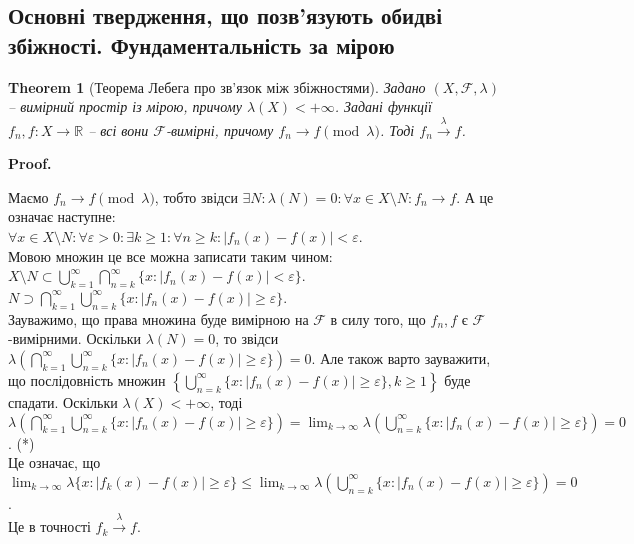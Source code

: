 \documentclass[a4paper, 10pt]{article}
\makeatletter
\theoremstyle{theoremdd}
\newtheorem{theorem}{Theorem}[subsection]
\newcommand\tomeasure[1]{\overset{{#1}}{\to}}
\renewenvironment{proof}[1][Proof.\\]{\par
\pushQED{\hfill \qed}%
\normalfont \topsep6\p@\@plus6\p@\relax
\trivlist
\item\relax
{\bfseries
#1\@addpunct{.}}\hspace\labelsep\ignorespaces
}{%
\popQED\endtrivlist\@endpefalse
}
\makeatother
\begin{document}
\subsection{Основні твердження, що позв'язують обидві збіжності. Фундаментальність за мірою}
\begin{theorem}[Теорема Лебега про зв'язок між збіжностями]
Задано $(X,\mathcal{F},\lambda)$ -- вимірний простір із мірою, причому $\lambda(X) < +\infty$. Задані функції $f_n,f \colon X \to \mathbb{R}$ -- всі вони $\mathcal{F}$-вимірні, причому $f_n \to f \pmod \lambda$. Тоді $f_n \tomeasure{\lambda} f$.
\end{theorem}

\begin{proof}
Маємо $f_n \to f \pmod \lambda$, тобто звідси $\exists N: \lambda(N) = 0: \forall x \in X \setminus N: f_n \to f$. А це означає наступне:\\
$\forall x \in X \setminus N: \forall \varepsilon > 0: \exists k \geq 1: \forall n \geq k: |f_n(x)-f(x)| < \varepsilon$.\\
Мовою множин це все можна записати таким чином:\\
$X \setminus N \subset \displaystyle\bigcup_{k=1}^\infty \bigcap_{n = k}^\infty \{x : |f_n(x)-f(x)| < \varepsilon\}$.\\
$\displaystyle N \supset \bigcap_{k=1}^\infty \bigcup_{n = k}^\infty \{x : |f_n(x)-f(x)| \geq \varepsilon\}$.\\
Зауважимо, що права множина буде вимірною на $\mathcal{F}$ в силу того, що $f_n,f$ є $\mathcal{F}$-вимірними. Оскільки $\lambda(N) = 0$, то звідси $\displaystyle\lambda\left( \bigcap_{k=1}^\infty \bigcup_{n = k}^\infty \{x : |f_n(x)-f(x)| \geq \varepsilon\} \right) = 0$. Але також варто зауважити, що послідовність множин $\displaystyle\left\{ \bigcup_{n = k}^\infty \{x : |f_n(x)-f(x)| \geq \varepsilon\}, k \geq 1 \right\}$ буде спадати. Оскільки $\lambda(X) < +\infty$, тоді $\displaystyle\lambda\left( \bigcap_{k=1}^\infty \bigcup_{n = k}^\infty \{x : |f_n(x)-f(x)| \geq \varepsilon\} \right) = \lim_{k \to \infty} \lambda\left( \bigcup_{n=k}^\infty \{x: |f_n(x)-f(x)| \geq \varepsilon\} \right) = 0$. (*)\\
Це означає, що $\displaystyle\lim_{k \to \infty}\lambda\{x : |f_k(x) - f(x)| \geq \varepsilon\} \leq \lim_{k \to \infty} \lambda\left( \bigcup_{n=k}^\infty \{x: |f_n(x)-f(x)| \geq \varepsilon\} \right) = 0$.\\
Це в точності $f_k \tomeasure{\lambda} f$.
\end{proof}
\end{document}
